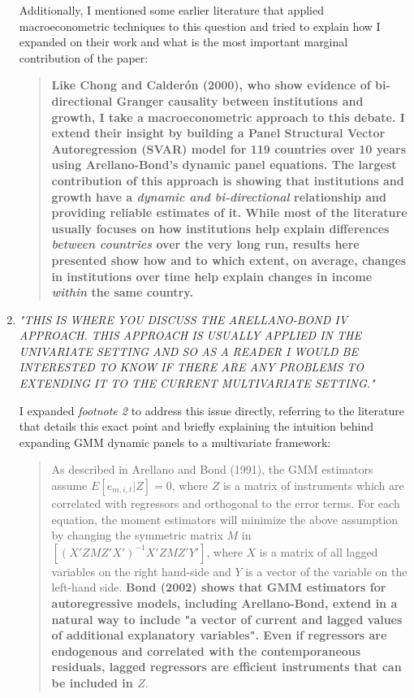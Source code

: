 \documentclass{article}
\begin{document}
\begin{enumerate}
    Additionally, I mentioned some earlier literature that applied macroeconometric techniques to this question and tried to explain how I expanded on their work and what is the most important marginal contribution of the paper:

    \begin{quote}    
        \textbf{Like Chong and Calderón (2000), who show evidence of bi-directional Granger causality between institutions and growth, I take a macroeconometric approach to this debate. I extend their insight by building a Panel Structural Vector Autoregression (SVAR) model for 119 countries over 10 years using Arellano-Bond's dynamic panel equations. The largest contribution of this approach is showing that institutions and growth have a \textit{dynamic and bi-directional} relationship and providing reliable estimates of it. While most of the literature usually focuses on how institutions help explain differences \textit{between countries} over the very long run, results here presented show how and to which extent, on average, changes in institutions over time help explain changes in income \textit{within} the same country.}
    \end{quote}

    
    \item \textit{"THIS IS WHERE YOU DISCUSS THE ARELLANO-BOND IV APPROACH. THIS APPROACH IS USUALLY APPLIED IN THE UNIVARIATE SETTING AND SO AS A READER I WOULD BE INTERESTED TO KNOW IF THERE ARE ANY PROBLEMS TO EXTENDING IT TO THE CURRENT MULTIVARIATE SETTING."}
    
    I expanded \textit{footnote 2} to address this issue directly, referring to the literature that details this exact point and briefly explaining the intuition behind expanding GMM dynamic panels to a multivariate framework:
    
    \begin{quote}
        As described in Arellano and Bond (1991), the GMM estimators assume $E[e_{m,i,t}|Z] = 0$, where $Z$ is a matrix of instruments which are correlated with regressors and orthogonal to the error terms. For each equation, the moment estimators will minimize the above assumption by changing the symmetric matrix $M$ in $[(X'ZMZ'X')^{-1}X'ZMZ'Y']$, where $X$ is a matrix of all lagged variables on the right hand-side and $Y$ is a vector of the variable on the left-hand side. \textbf{Bond (2002) shows that GMM estimators for autoregressive models, including Arellano-Bond, extend in a natural way to include "a vector of current and lagged values of additional explanatory variables". Even if regressors are endogenous and correlated with the contemporaneous residuals, lagged regressors are efficient instruments that can be included in $Z$}.
    \end{quote}
        

\end{enumerate}
\end{document}
